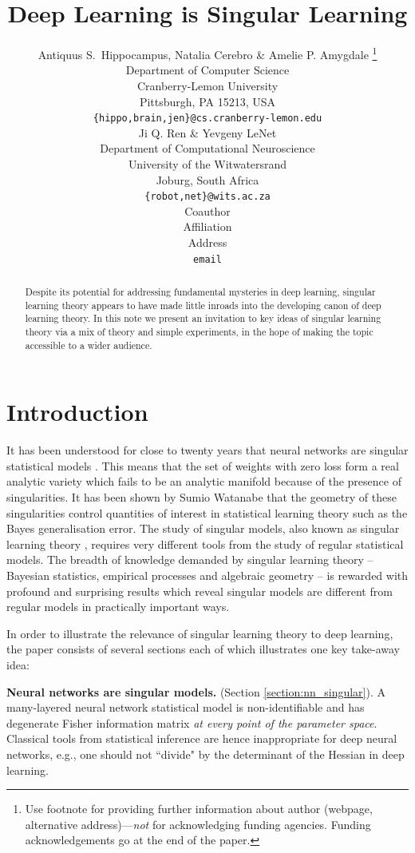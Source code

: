 \documentclass{article} %
\title{Deep Learning is Singular Learning}
\author{Antiquus S.~Hippocampus, Natalia Cerebro \& Amelie P. Amygdale \thanks{ Use footnote for providing further information
about author (webpage, alternative address)---\emph{not} for acknowledging
funding agencies.  Funding acknowledgements go at the end of the paper.} \\
Department of Computer Science\\
Cranberry-Lemon University\\
Pittsburgh, PA 15213, USA \\
\texttt{\{hippo,brain,jen\}@cs.cranberry-lemon.edu} \\
\And
Ji Q. Ren \& Yevgeny LeNet \\
Department of Computational Neuroscience \\
University of the Witwatersrand \\
Joburg, South Africa \\
\texttt{\{robot,net\}@wits.ac.za} \\
\AND
Coauthor \\
Affiliation \\
Address \\
\texttt{email}
}
\begin{document}
\maketitle

\begin{abstract}
Despite its potential for addressing fundamental mysteries in deep learning, singular learning theory appears to have made little inroads into the developing canon of deep learning theory. In this note we present an invitation to key ideas of singular learning theory via a mix of theory and simple experiments, in the hope of making the topic accessible to a wider audience. 
\end{abstract}

\section{Introduction}

It has been understood for close to twenty years that neural networks are singular statistical models \cite{amari_learning_2003, watanabe_almost_2007}. This means that the set of weights with zero loss form a real analytic variety which fails to be an analytic manifold because of the presence of singularities. It has been shown by Sumio Watanabe that the geometry of these singularities control quantities of interest in statistical learning theory such as the Bayes generalisation error. The study of singular models, also known as singular learning theory \citep{watanabe_algebraic_2009}, requires very different tools from the study of regular statistical models. The breadth of knowledge demanded by singular learning theory -- Bayesian statistics, empirical processes and algebraic geometry -- is rewarded with profound and surprising results which reveal singular models are different from regular models in practically important ways.

In order to illustrate the relevance of singular learning theory to deep learning, the paper consists of several sections each of which illustrates one key take-away idea:

\textbf{Neural networks are singular models.} (Section \ref{section:nn_singular}). A many-layered neural network statistical model is non-identifiable and has degenerate Fisher information matrix \emph{at every point of the parameter space}. Classical tools from statistical inference are hence inappropriate for deep neural networks, e.g., one should not ``divide" by the determinant of the Hessian in deep learning. 
\end{document}

